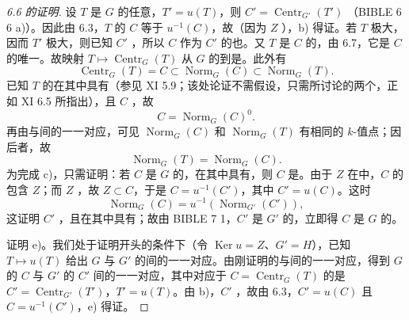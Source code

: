 \begin{proof}[6.6 的证明]
设 $T$ 是 $G$ 的任意，$T'=u(T)$，则 $C'=\operatorname{Centr}_{G'}(T')$ （BIBLE 6  6 a)）。因此由 6.3，$T$ 的 $C$ 等于 $u^{-1}(C)$，故（因为 $Z$ ），b) 得证。若 $T$ 极大，因而 $T'$ 极大，则已知 $C'$ ，所以 $C$ 作为 $C'$ 的也。又 $T$ 是 $C$ 的，由 6.7，它是 $C$ 的唯一。故映射 $T\mapsto\operatorname{Centr}_G(T)$ 从 $G$ 的到是。此外有
\[
\operatorname{Centr}_G(T)=C\subset\operatorname{Norm}_G(C)\subset\operatorname{Norm}_G(T).
\]
已知 $T$ 的在其中具有（参见 XI 5.9；该处论证不需假设，只需所讨论的两个，正如 XI 6.5 所指出），且 $C$ ，故
\[
C=\operatorname{Norm}_G(C)^0.
\]
再由与间的一一对应，可见 $\operatorname{Norm}_G(C)$ 和 $\operatorname{Norm}_G(T)$ 有相同的 $k$-值点；因后者，故
\[
\operatorname{Norm}_G(T)=\operatorname{Norm}_G(C).
\]
为完成 c)，只需证明：若 $C$ 是 $G$ 的，在其中具有，则 $C$ 是。由于 $Z$ 在中，$C$ 的包含 $Z$；而 $Z$ ，故 $Z\subset C$，于是 $C=u^{-1}(C')$，其中 $C'=u(C)$。这时
\[
\operatorname{Norm}_G(C)=u^{-1}(\operatorname{Norm}_{G'}(C')),
\]
这证明 $C'$ ，且在其中具有；故由 BIBLE 7  1，$C'$ 是 $G'$ 的，立即得 $C$ 是 $G$ 的。

证明 e)。我们处于证明开头的条件下（令 $\operatorname{Ker}u=Z$、$G'=H$），已知 $T\mapsto u(T)$ 给出 $G$ 与 $G'$ 的间的一一对应。由刚证明的与间的一一对应，得到 $G$ 的 $C$ 与 $G'$ 的 $C'$ 间的一一对应，其中对应于 $C=\operatorname{Centr}_G(T)$ 的是 $C'=\operatorname{Centr}_{G'}(T')$，$T'=u(T)$。由 b)，$C'$ ，故由 6.3，$C'=u(C)$ 且 $C=u^{-1}(C')$，e) 得证。


\end{proof}
